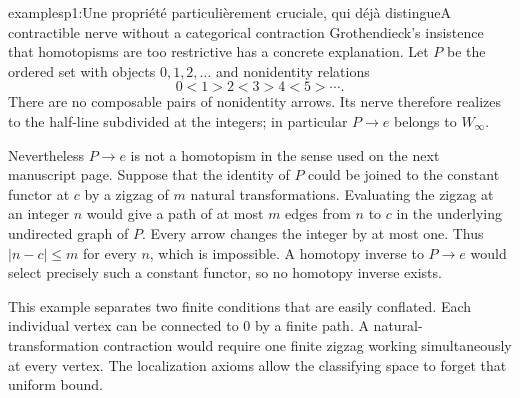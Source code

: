 \begin{dcomment}{examples}{p1:Une propriété particulièrement cruciale, qui déjà distingue}{A contractible nerve without a categorical contraction}
Grothendieck's insistence that homotopisms are too restrictive has a concrete explanation. Let \(P\) be the ordered set with objects \(0,1,2,\ldots\) and nonidentity relations
\[
  0<1>2<3>4<5>\cdots .
\]
There are no composable pairs of nonidentity arrows. Its nerve therefore realizes to the half-line subdivided at the integers; in particular \(P\to e\) belongs to \(W_\infty\).

Nevertheless \(P\to e\) is not a homotopism in the sense used on the next manuscript page. Suppose that the identity of \(P\) could be joined to the constant functor at \(c\) by a zigzag of \(m\) natural transformations. Evaluating the zigzag at an integer \(n\) would give a path of at most \(m\) edges from \(n\) to \(c\) in the underlying undirected graph of \(P\). Every arrow changes the integer by at most one. Thus \(|n-c|\leq m\) for every \(n\), which is impossible. A homotopy inverse to \(P\to e\) would select precisely such a constant functor, so no homotopy inverse exists.

This example separates two finite conditions that are easily conflated. Each individual vertex can be connected to \(0\) by a finite path. A natural-transformation contraction would require one finite zigzag working simultaneously at every vertex. The localization axioms allow the classifying space to forget that uniform bound.
\end{dcomment}

